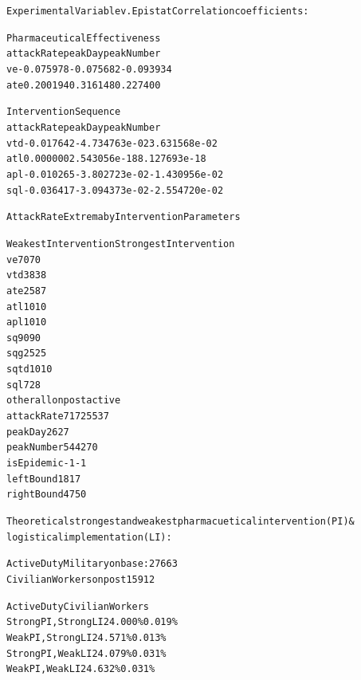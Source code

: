 \documentclass[letterpaper,10pt,english]{/Library/Python/2.7/site-packages/sphinx/texinputs/sphinxhowto}
\newenvironment{InvisibleVerbatim}
        {\begin{mdframed}[leftmargin=0.1\linewidth,innerleftmargin=3pt,innerrightmargin=3pt, userdefinedwidth=1\linewidth, linewidth=0pt, linecolor=white, usetwoside=false]}
        {\end{mdframed}}
\begin{document}
                \begin{InvisibleVerbatim}
                \vspace{-0.5\baselineskip}
\begin{alltt}Experimental Variable v. Epistat Correlation coefficients:

Pharmaceutical Effectiveness
     attackRate   peakDay  peakNumber
ve    -0.075978 -0.075682   -0.093934
ate    0.200194  0.316148    0.227400

Intervention Sequence
     attackRate       peakDay    peakNumber
vtd   -0.017642 -4.734763e-02  3.631568e-02
atl    0.000000  2.543056e-18  8.127693e-18
apl   -0.010265 -3.802723e-02 -1.430956e-02
sql   -0.036417 -3.094373e-02 -2.554720e-02


Attack Rate Extrema by Intervention Parameters

           Weakest Intervention Strongest Intervention
ve                           70                     70
vtd                          38                     38
ate                          25                     87
atl                          10                     10
apl                          10                     10
sq                           90                     90
sqg                          25                     25
sqtd                         10                     10
sql                           7                     28
other                 allonpost                 active
attackRate                 7172                   5537
peakDay                      26                     27
peakNumber                  544                    270
isEpidemic                   -1                     -1
leftBound                    18                     17
rightBound                   47                     50


Theoretical strongest and weakest pharmacuetical intervention (PI) \&
logistical implementation (LI):

Active Duty Military on base: 27663
Civilian Workers on post 15912

                Active Duty     Civilian Workers
Strong PI, Strong LI    24.000\%         0.019\%
Weak PI, Strong LI      24.571\%         0.013\%
Strong PI, Weak LI      24.079\%         0.031\%
Weak PI, Weak LI        24.632\%         0.031\%



\end{alltt}

            \end{InvisibleVerbatim}
            
\end{document}
